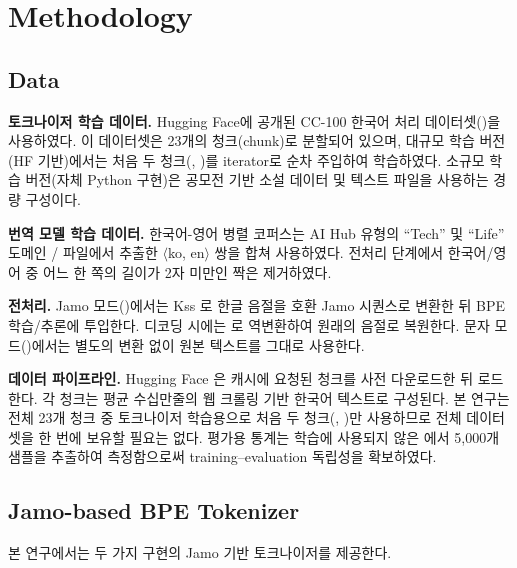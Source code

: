 \documentclass[sigconf,nonacm]{acmart}
\begin{document}
\section{Methodology}
\label{sec:method}

\subsection{Data}

\textbf{토크나이저 학습 데이터.} Hugging Face에 공개된 CC-100 한국어 처리
데이터셋()을 사용하였다. 이 데이터셋은 23개의 청크(chunk)로
분할되어 있으며, 대규모 학습 버전(HF 기반)에서는 처음 두 청크(, )를
iterator로 순차 주입하여 학습하였다. 소규모 학습 버전(자체 Python 구현)은 공모전 기반 소설 데이터
및 텍스트 파일을 사용하는 경량 구성이다.

\textbf{번역 모델 학습 데이터.} 한국어-영어 병렬 코퍼스는 AI Hub 유형의 ``Tech'' 및 ``Life'' 도메인
 /  파일에서 추출한
$\langle$ko, en$\rangle$ 쌍을 합쳐 사용하였다.
전처리 단계에서 한국어/영어 중 어느 한 쪽의 길이가 2자 미만인 짝은 제거하였다.

\textbf{전처리.} Jamo 모드()에서는 Kss 로 한글 음절을
호환 Jamo 시퀀스로 변환한 뒤 BPE 학습/추론에 투입한다. 디코딩 시에는 로
역변환하여 원래의 음절로 복원한다. 문자 모드()에서는 별도의 변환 없이
원본 텍스트를 그대로 사용한다.

\textbf{데이터 파이프라인.} Hugging Face 은 
캐시에 요청된 청크를 사전 다운로드한 뒤 로드한다. 각 청크는 평균 수십만 줄의
웹 크롤링 기반 한국어 텍스트로 구성된다. 본 연구는 전체 23개 청크 중 토크나이저 학습용으로 처음 두
청크(, )만 사용하므로 전체 데이터셋을 한 번에 보유할 필요는 없다.
평가용 통계는 학습에 사용되지 않은 에서 5,000개 샘플을 추출하여 측정함으로써
training--evaluation 독립성을 확보하였다.

\subsection{Jamo-based BPE Tokenizer}

본 연구에서는 두 가지 구현의 Jamo 기반 토크나이저를 제공한다.
\end{document}
